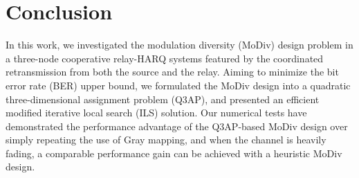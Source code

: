 \documentclass[journal]{IEEEtran}
\begin{document}
\section{Conclusion}
\label{sec:conclusion}
In this work, we investigated the modulation diversity (MoDiv) design problem in
a three-node cooperative relay-HARQ systems featured by the coordinated
retransmission from both the source and the relay. Aiming to minimize the bit
error rate (BER) upper bound, we formulated the MoDiv design into a quadratic
three-dimensional assignment problem (Q3AP), and presented an efficient modified
iterative local search (ILS) solution. Our numerical tests have demonstrated the
performance advantage of the Q3AP-based MoDiv design over simply repeating the
use of Gray mapping, and when the channel is heavily fading, a comparable
performance gain can be achieved with a heuristic MoDiv design. 













%




\end{document}
